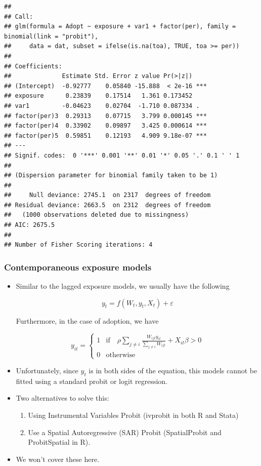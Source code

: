 \documentclass[
]{book}
\begin{document}
\begin{itemize}
\begin{verbatim}
## 
## Call:
## glm(formula = Adopt ~ exposure + var1 + factor(per), family = binomial(link = "probit"), 
##     data = dat, subset = ifelse(is.na(toa), TRUE, toa >= per))
## 
## Coefficients:
##              Estimate Std. Error z value Pr(>|z|)    
## (Intercept)  -0.92777    0.05840 -15.888  < 2e-16 ***
## exposure      0.23839    0.17514   1.361 0.173452    
## var1         -0.04623    0.02704  -1.710 0.087334 .  
## factor(per)3  0.29313    0.07715   3.799 0.000145 ***
## factor(per)4  0.33902    0.09897   3.425 0.000614 ***
## factor(per)5  0.59851    0.12193   4.909 9.18e-07 ***
## ---
## Signif. codes:  0 '***' 0.001 '**' 0.01 '*' 0.05 '.' 0.1 ' ' 1
## 
## (Dispersion parameter for binomial family taken to be 1)
## 
##     Null deviance: 2745.1  on 2317  degrees of freedom
## Residual deviance: 2663.5  on 2312  degrees of freedom
##   (1000 observations deleted due to missingness)
## AIC: 2675.5
## 
## Number of Fisher Scoring iterations: 4
\end{verbatim}
\end{itemize}

\hypertarget{contemporaneous-exposure-models}{%
\subsubsection{Contemporaneous exposure models}\label{contemporaneous-exposure-models}}

\begin{itemize}
\item
  Similar to the lagged exposure models, we usually have the following

  \[
  y_t = f(W_t, y_t, X_t) + \varepsilon
  \]

  Furthermore, in the case of adoption, we have

  \[
  y_{it} = \left\{
  \begin{array}{ll}
  1 & \mbox{if}\quad \rho\sum_{j\neq i}\frac{W_{ijt}y_{it}}{\sum_{j\neq i}W_{ijt}} + X_{it}\beta > 0\\
  0 & \mbox{otherwise}
  \end{array}
  \right.
  \]
\item
  Unfortunately, since \(y_t\) is in both sides of the equation, this models cannot
  be fitted using a standard probit or logit regression.
\item
  Two alternatives to solve this:

  \begin{enumerate}
  \def\labelenumi{\alph{enumi}.}
  \item
    Using Instrumental Variables Probit (ivprobit in both R and Stata)
  \item
    Use a Spatial Autoregressive (SAR) Probit (SpatialProbit and ProbitSpatial in R).
  \end{enumerate}
\item
  We won't cover these here.
\end{itemize}
\end{document}

